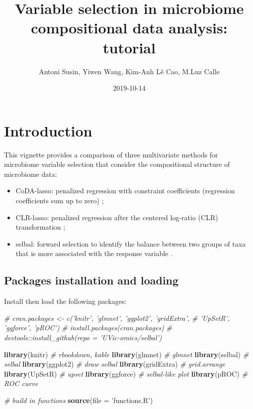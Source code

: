 \documentclass[openany]{book}
\title{Variable selection in microbiome compositional data analysis: tutorial}
\author{Antoni Susin, Yiwen Wang, Kim-Anh Lê Cao, M.Luz Calle}
\date{2019-10-14}
\newenvironment{Shaded}{\begin{snugshade}}{\end{snugshade}}
\newcommand{\KeywordTok}[1]{\textcolor[rgb]{0.13,0.29,0.53}{\textbf{#1}}}
\newcommand{\DataTypeTok}[1]{\textcolor[rgb]{0.13,0.29,0.53}{#1}}
\newcommand{\StringTok}[1]{\textcolor[rgb]{0.31,0.60,0.02}{#1}}
\newcommand{\CommentTok}[1]{\textcolor[rgb]{0.56,0.35,0.01}{\textit{#1}}}
\newcommand{\NormalTok}[1]{#1}
\providecommand{\tightlist}{%
  \setlength{\itemsep}{0pt}\setlength{\parskip}{0pt}}
\begin{document}
\maketitle

{
\setcounter{tocdepth}{3}
\tableofcontents
}
\chapter{Introduction}\label{introduction}

This vignette provides a comparison of three multivariate methods for
microbiome variable selection that consider the compositional structure
of microbiome data:

\begin{itemize}
\tightlist
\item
  CoDA-lasso: penalized regression with constraint coefficients
  (regression coefficients sum up to zero)
  \citep{lu2019generalized, lin2014variable};
\item
  CLR-lasso: penalized regression after the centered log-ratio (CLR)
  transformation
  \citep{zou2005regularization, tibshirani1996regression, le1992ridge};
\item
  selbal: forward selection to identify the balance between two groups
  of taxa that is more associated with the response variable
  \citep{rivera2018balances}.
\end{itemize}

\section{Packages installation and
loading}\label{packages-installation-and-loading}

Install then load the following packages:

\begin{Shaded}
\begin{Highlighting}[]
\CommentTok{# cran.packages <- c('knitr', 'glmnet', 'ggplot2', 'gridExtra',}
\CommentTok{#                    'UpSetR', 'ggforce', 'pROC')}
\CommentTok{# install.packages(cran.packages)}
\CommentTok{# devtools::install_github(repo = 'UVic-omics/selbal')}

\KeywordTok{library}\NormalTok{(knitr) }\CommentTok{# rbookdown, kable}
\KeywordTok{library}\NormalTok{(glmnet) }\CommentTok{# glmnet}
\KeywordTok{library}\NormalTok{(selbal) }\CommentTok{# selbal}
\KeywordTok{library}\NormalTok{(ggplot2) }\CommentTok{# draw selbal}
\KeywordTok{library}\NormalTok{(gridExtra) }\CommentTok{# grid.arrange}
\KeywordTok{library}\NormalTok{(UpSetR) }\CommentTok{# upset}
\KeywordTok{library}\NormalTok{(ggforce) }\CommentTok{# selbal-like plot}
\KeywordTok{library}\NormalTok{(pROC) }\CommentTok{# ROC curve}

\CommentTok{# build in functions}
\KeywordTok{source}\NormalTok{(}\DataTypeTok{file =} \StringTok{'functions.R'}\NormalTok{)}
\end{Highlighting}
\end{Shaded}
\end{document}
